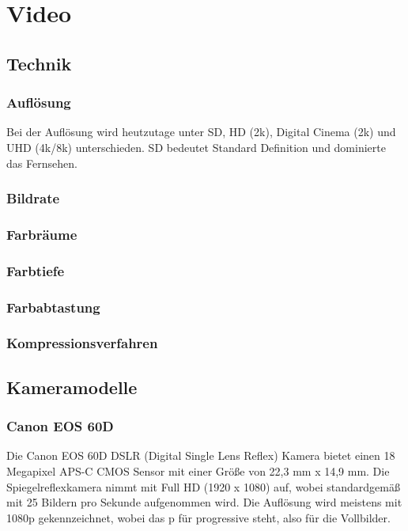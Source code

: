 \chapter{Video}
\renewcommand{\kapitelautor}{Autor: Kerstin Schön}
\section{Technik}
\subsection{Auflösung}
Bei der Auflösung wird heutzutage unter SD, HD (2k), Digital Cinema (2k) und UHD (4k/8k) unterschieden. SD bedeutet Standard Definition und dominierte das Fernsehen. 
\subsection{Bildrate}
\subsection{Farbräume}
\subsection{Farbtiefe}
\subsection{Farbabtastung}
\subsection{Kompressionsverfahren}
\section{Kameramodelle}
\subsection{Canon EOS 60D}
Die Canon EOS 60D DSLR (Digital Single Lens Reflex) Kamera bietet einen 18 Megapixel APS-C CMOS Sensor mit einer Größe von 22,3 mm x 14,9 mm. Die Spiegelreflexkamera nimmt mit Full HD (1920 x 1080) auf, wobei standardgemäß mit 25 Bildern pro Sekunde aufgenommen wird. Die Auflösung wird meistens mit 1080p gekennzeichnet, wobei das p für progressive steht, also für die Vollbilder.
